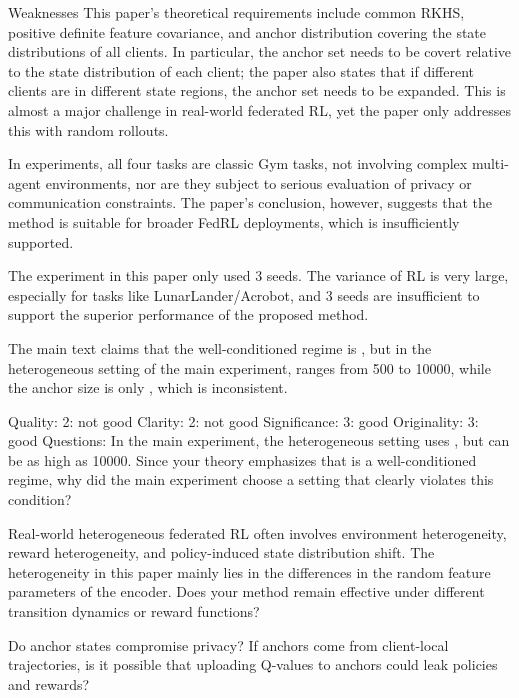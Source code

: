 Weaknesses
This paper's theoretical requirements include common RKHS, positive definite feature covariance, and anchor distribution covering the state distributions of all clients. In particular, the anchor set needs to be covert relative to the state distribution of each client; the paper also states that if different clients are in different state regions, the anchor set needs to be expanded. This is almost a major challenge in real-world federated RL, yet the paper only addresses this with random rollouts.

In experiments, all four tasks are classic Gym tasks, not involving complex multi-agent environments, nor are they subject to serious evaluation of privacy or communication constraints. The paper's conclusion, however, suggests that the method is suitable for broader FedRL deployments, which is insufficiently supported.

The experiment in this paper only used 3 seeds. The variance of RL is very large, especially for tasks like LunarLander/Acrobot, and 3 seeds are insufficient to support the superior performance of the proposed method.

The main text claims that the well-conditioned regime is 
, but in the heterogeneous setting of the main experiment, 
 ranges from 500 to 10000, while the anchor size is only 
, which is inconsistent.

Quality: 2: not good
Clarity: 2: not good
Significance: 3: good
Originality: 3: good
Questions:
In the main experiment, the heterogeneous setting uses 
, but 
 can be as high as 10000. Since your theory emphasizes that 
 is a well-conditioned regime, why did the main experiment choose a setting that clearly violates this condition?

Real-world heterogeneous federated RL often involves environment heterogeneity, reward heterogeneity, and policy-induced state distribution shift. The heterogeneity in this paper mainly lies in the differences in the random feature parameters of the encoder. Does your method remain effective under different transition dynamics or reward functions?

Do anchor states compromise privacy? If anchors come from client-local trajectories, is it possible that uploading Q-values ​​to anchors could leak policies and rewards?